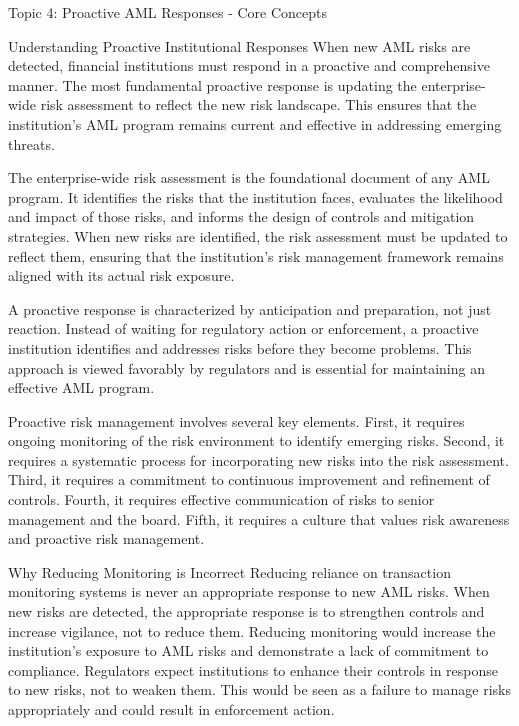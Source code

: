\documentclass[5pt]{beamer}
\begin{document}
	\begin{frame}{Topic 4: Proactive AML Responses - Core Concepts}
		\begin{block}{\tiny Understanding Proactive Institutional Responses}
			\tiny When new AML risks are detected, financial institutions must respond in a proactive and comprehensive manner. The most fundamental proactive response is updating the enterprise-wide risk assessment to reflect the new risk landscape. This ensures that the institution's AML program remains current and effective in addressing emerging threats.
			
			The enterprise-wide risk assessment is the foundational document of any AML program. It identifies the risks that the institution faces, evaluates the likelihood and impact of those risks, and informs the design of controls and mitigation strategies. When new risks are identified, the risk assessment must be updated to reflect them, ensuring that the institution's risk management framework remains aligned with its actual risk exposure.
			
			A proactive response is characterized by anticipation and preparation, not just reaction. Instead of waiting for regulatory action or enforcement, a proactive institution identifies and addresses risks before they become problems. This approach is viewed favorably by regulators and is essential for maintaining an effective AML program.
			
			Proactive risk management involves several key elements. First, it requires ongoing monitoring of the risk environment to identify emerging risks. Second, it requires a systematic process for incorporating new risks into the risk assessment. Third, it requires a commitment to continuous improvement and refinement of controls. Fourth, it requires effective communication of risks to senior management and the board. Fifth, it requires a culture that values risk awareness and proactive risk management.
		\end{block}
		
		\begin{block}{\tiny Why Reducing Monitoring is Incorrect}
			\tiny Reducing reliance on transaction monitoring systems is never an appropriate response to new AML risks. When new risks are detected, the appropriate response is to strengthen controls and increase vigilance, not to reduce them. Reducing monitoring would increase the institution's exposure to AML risks and demonstrate a lack of commitment to compliance. Regulators expect institutions to enhance their controls in response to new risks, not to weaken them. This would be seen as a failure to manage risks appropriately and could result in enforcement action.
		\end{block}
		

\end{frame}
\end{document}
